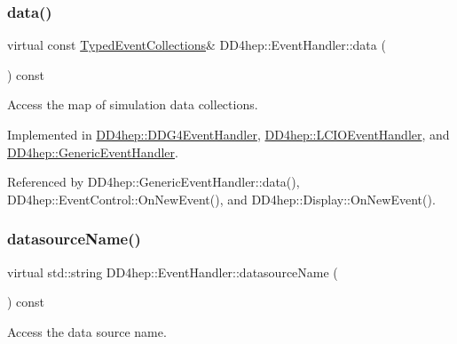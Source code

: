 \subsubsection{\texorpdfstring{data()}{data()}}
{\footnotesize\ttfamily virtual const \hyperlink{class_d_d4hep_1_1_event_handler_a4d441ff8a824b1e2f278e8b7a6391af3}{Typed\+Event\+Collections}\& D\+D4hep\+::\+Event\+Handler\+::data (\begin{DoxyParamCaption}{ }\end{DoxyParamCaption}) const\hspace{0.3cm}{\ttfamily [pure virtual]}}



Access the map of simulation data collections. 



Implemented in \hyperlink{class_d_d4hep_1_1_d_d_g4_event_handler_aca1f9d6fca9322b89815c68529fac540}{D\+D4hep\+::\+D\+D\+G4\+Event\+Handler}, \hyperlink{class_d_d4hep_1_1_l_c_i_o_event_handler_af024dd8d16f2b4b686aa83708451522f}{D\+D4hep\+::\+L\+C\+I\+O\+Event\+Handler}, and \hyperlink{class_d_d4hep_1_1_generic_event_handler_ad4d0029a1db989c61a3bbb72f299f12e}{D\+D4hep\+::\+Generic\+Event\+Handler}.



Referenced by D\+D4hep\+::\+Generic\+Event\+Handler\+::data(), D\+D4hep\+::\+Event\+Control\+::\+On\+New\+Event(), and D\+D4hep\+::\+Display\+::\+On\+New\+Event().

\hypertarget{class_d_d4hep_1_1_event_handler_a5fa231363a787ba7edf520b5a99f294e}{}\label{class_d_d4hep_1_1_event_handler_a5fa231363a787ba7edf520b5a99f294e} 
\subsubsection{\texorpdfstring{datasource\+Name()}{datasourceName()}}
{\footnotesize\ttfamily virtual std\+::string D\+D4hep\+::\+Event\+Handler\+::datasource\+Name (\begin{DoxyParamCaption}{ }\end{DoxyParamCaption}) const\hspace{0.3cm}{\ttfamily [pure virtual]}}



Access the data source name. 



